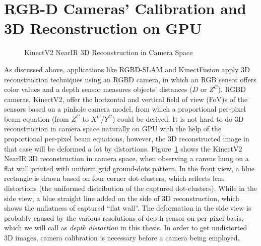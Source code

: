 \section{RGB-D Cameras' Calibration and 3D Reconstruction on GPU}
\label{sectionRGBDcameraCalibration}
\indent
 \begin{figure}[b]
{}
\caption{KinectV2 NearIR 3D Reconstruction in Camera Space}
\label{NearIR}
\end{figure}%
%
As discussed above, applications like RGBD-SLAM and KinectFusion apply 3D reconstruction techniques using an RGBD camera, in which an RGB sensor offers color values and a depth sensor measures objects' distances (\(D\) or \(Z^C\)). RGBD cameras,  KinectV2, offer the horizontal and vertical field of view (FoV)s of the sensors based on a pinhole camera model, from which a proportional per-pixel beam equation (from \(Z^C\) to \(X^C/Y^C\)) could be derived. It is not hard to do 3D reconstruction in camera space naturally on GPU with the help of the proportional per-pixel beam equations, however, the 3D reconstructed image in that case will be deformed a lot by distortions. Figure~\ref{NearIR} shows the KinectV2 NearIR 3D reconstruction in camera space, when observing a canvas hung on a flat wall printed with uniform grid ground-dots pattern. In the front view, a blue rectangle is drawn based on four corner dot-clusters, which reflects lens distortions (the uniformed distribution of the captured dot-clusters). While in the side view, a blue straight line added on the side of 3D reconstruction, which shows the unflatness of captured \enquote{flat wall}. The deformation in the side view is probably caused by the various resolutions of depth sensor on per-pixel basis, which we will call as \emph{depth distortion} in this thesis. In order to get undistorted 3D images, camera calibration is necessary before a camera being employed.
\\\indent%
